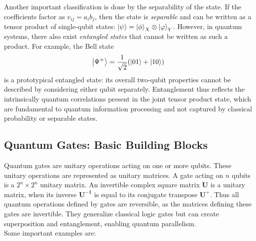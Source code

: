\documentclass[encoding=utf8,british]{tumphthesis}
\begin{document}
        Another important classification is done by the separability of the state. If the coefficients factor as $v_{ij} = a_i b_j$, then the state is \textit{separable} and can be written as a tensor product of single-qubit 
        states: $\left|\psi\right> = \left|\phi\right>_X \otimes \left|\varphi\right>_Y$. However, in quantum systems, there also exist \textit{entangled states} that cannot be written as such a product. For example, the Bell state
        \begin{equation*}
            \left|\Psi^+\right> = \frac{1}{\sqrt{2}} (\left|01\right> + \left|10\right>)
        \end{equation*}
        is a prototypical entangled state: its overall two-qubit properties cannot be described by considering either qubit separately. Entanglement thus reflects the intrinsically quantum correlations present in the joint tensor product state, which are fundamental to quantum information processing and not captured by classical probability or separable states.

        \subsection{Quantum Gates: Basic Building Blocks}
        Quantum gates are unitary operations acting on one or more qubits. These unitary operations are represented as unitary matrices. 
        A gate acting on $n$ qubits is a $2^n \times 2^n$ unitary matrix. An invertible complex square matrix \textbf{U} is a unitary matrix, 
        when its inverse $\mathbf{U^{-1}}$ is equal to its conjugate transpose $\mathbf{U^+}$. Thus all quantum operations defined by gates are reversible,
        as the matrices defining these gates are invertible. They generalize classical logic gates but can create superposition and entanglement, enabling quantum parallelism. 
        \\
        Some important examples are:
\end{document}
